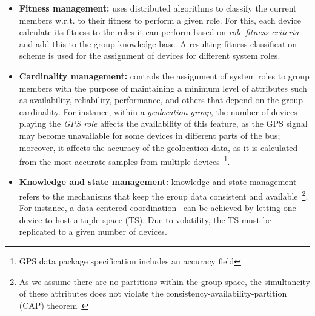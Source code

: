 


\begin{itemize}
	
	\item \textbf{Fitness management:} uses distributed algorithms to classify the current members w.r.t. to their fitness to perform a given role. For this, each device calculate its fitness to the roles it can perform based on \textit{role fitness criteria} and add this to the group knowledge base. A resulting fitness classification scheme is used for the assignment of devices for different system roles.
	
	\item \textbf{Cardinality management:} controls the assignment of system roles to group members with the purpose of maintaining a minimum level of attributes such as availability, reliability, performance, and others that depend on the group cardinality. For instance, within a \textit{geolocation group}, the number of devices playing the \textit{GPS role} affects the availability of this feature, as the GPS signal may become unavailable for some devices in different parts of the bus; moreover, it affects the accuracy of the geolocation data, as it is calculated from the most accurate samples from multiple devices~\footnote{GPS data package specification includes an accuracy field}.
	
	\item \textbf{Knowledge and state management:} knowledge and state management refers to the mechanisms that keep the group data consistent and available~\footnote{As we  assume there are no partitions within the group space, the simultaneity of these attributes does not violate the consistency-availability-partition (CAP) theorem~\cite{CAP}}. For instance, a data-centered coordination~\cite{} can be achieved by letting one device to host a tuple space (TS). Due to volatility, the TS must be replicated to a given number of devices.
	
\end{itemize}

